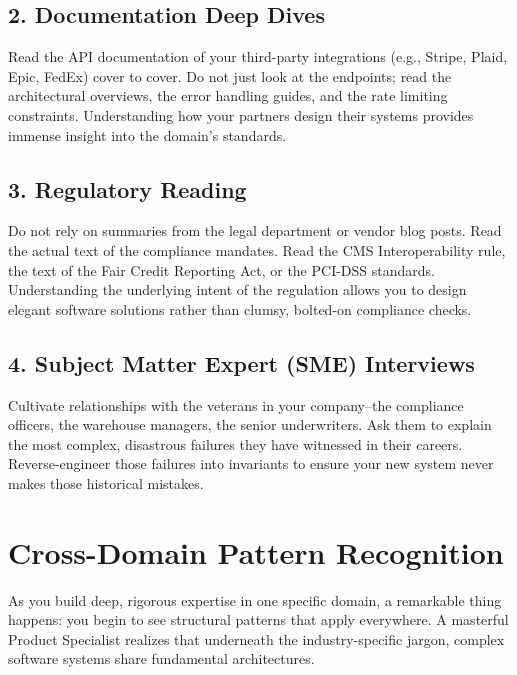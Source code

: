 \documentclass[
  11pt,
  openany,
  oneside]{book}
\begin{document}
\subsection{2. Documentation Deep Dives}\label{documentation-deep-dives}

Read the API documentation of your third-party integrations (e.g.,
Stripe, Plaid, Epic, FedEx) cover to cover. Do not just look at the
endpoints; read the architectural overviews, the error handling guides,
and the rate limiting constraints. Understanding how your partners
design their systems provides immense insight into the domain's
standards.

\subsection{3. Regulatory Reading}\label{regulatory-reading}

Do not rely on summaries from the legal department or vendor blog posts.
Read the actual text of the compliance mandates. Read the CMS
Interoperability rule, the text of the Fair Credit Reporting Act, or the
PCI-DSS standards. Understanding the underlying intent of the regulation
allows you to design elegant software solutions rather than clumsy,
bolted-on compliance checks.

\subsection{4. Subject Matter Expert (SME)
Interviews}\label{subject-matter-expert-sme-interviews}

Cultivate relationships with the veterans in your company--the
compliance officers, the warehouse managers, the senior underwriters.
Ask them to explain the most complex, disastrous failures they have
witnessed in their careers. Reverse-engineer those failures into
invariants to ensure your new system never makes those historical
mistakes.

\bigskip

\section{Cross-Domain Pattern
Recognition}\label{cross-domain-pattern-recognition}

As you build deep, rigorous expertise in one specific domain, a
remarkable thing happens: you begin to see structural patterns that
apply everywhere. A masterful Product Specialist realizes that
underneath the industry-specific jargon, complex software systems share
fundamental architectures.
\end{document}

